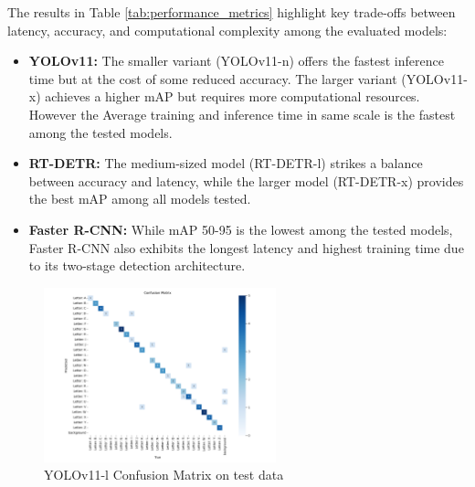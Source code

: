 \documentclass[a4paper]{article}
\begin{document}
The results in Table \ref{tab:performance_metrics} highlight key trade-offs between latency, accuracy, and computational complexity among the evaluated models:
\begin{itemize}
    \item \textbf{YOLOv11:} The smaller variant (YOLOv11-n) offers the fastest inference time but at the cost of some reduced accuracy. The larger variant (YOLOv11-x) achieves a higher mAP but requires more computational resources. 
    However the Average training and inference time in same scale is the fastest among the tested models.
    \item \textbf{RT-DETR:} The medium-sized model (RT-DETR-l) strikes a balance between accuracy and latency, while the larger model (RT-DETR-x) provides the best mAP among all models tested.
    \item \textbf{Faster R-CNN:} While mAP 50-95 is the lowest among the tested models, Faster R-CNN also exhibits the longest latency and highest training time due to its two-stage detection architecture.
\end{itemize}

\begin{figure}[htbp]
    \centering
    \includegraphics[width=0.6\textwidth]{./images/confusion_matrix.png}
    \caption{YOLOv11-l Confusion Matrix on test data}
    \label{fig:Images}
\end{figure}
\end{document}
